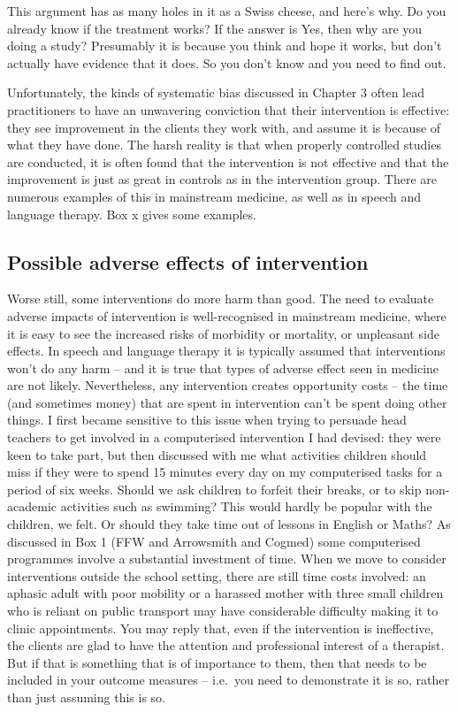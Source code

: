 \documentclass[]{book}
\begin{document}
This argument has as many holes in it as a Swiss cheese, and here's why. Do you already know if the treatment works? If the answer is Yes, then why are you doing a study? Presumably it is because you think and hope it works, but don't actually have evidence that it does. So you don't know and you need to find out.

Unfortunately, the kinds of systematic bias discussed in Chapter 3 often lead practitioners to have an unwavering conviction that their intervention is effective: they see improvement in the clients they work with, and assume it is because of what they have done. The harsh reality is that when properly controlled studies are conducted, it is often found that the intervention is not effective and that the improvement is just as great in controls as in the intervention group. There are numerous examples of this in mainstream medicine, as well as in speech and language therapy. Box x gives some examples.

\hypertarget{possible-adverse-effects-of-intervention}{%
\subsection{Possible adverse effects of intervention}\label{possible-adverse-effects-of-intervention}}

Worse still, some interventions do more harm than good. The need to evaluate adverse impacts of intervention is well-recognised in mainstream medicine, where it is easy to see the increased risks of morbidity or mortality, or unpleasant side effects. In speech and language therapy it is typically assumed that interventions won't do any harm -- and it is true that types of adverse effect seen in medicine are not likely. Nevertheless, any intervention creates opportunity costs -- the time (and sometimes money) that are spent in intervention can't be spent doing other things. I first became sensitive to this issue when trying to persuade head teachers to get involved in a computerised intervention I had devised: they were keen to take part, but then discussed with me what activities children should miss if they were to spend 15 minutes every day on my computerised tasks for a period of six weeks. Should we ask children to forfeit their breaks, or to skip non-academic activities such as swimming? This would hardly be popular with the children, we felt. Or should they take time out of lessons in English or Maths? As discussed in Box 1 (FFW and Arrowsmith and Cogmed) some computerised programmes involve a substantial investment of time.
When we move to consider interventions outside the school setting, there are still time costs involved: an aphasic adult with poor mobility or a harassed mother with three small children who is reliant on public transport may have considerable difficulty making it to clinic appointments. You may reply that, even if the intervention is ineffective, the clients are glad to have the attention and professional interest of a therapist. But if that is something that is of importance to them, then that needs to be included in your outcome measures -- i.e.~you need to demonstrate it is so, rather than just assuming this is so.
\end{document}
